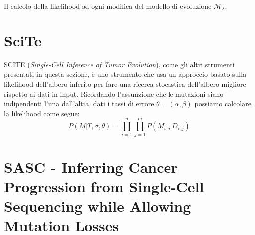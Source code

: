 Il calcolo della likelihood ad ogni modifica del modello di evoluzione $\mathcal{M}_\lambda$. 

\section{SciTe \cite{scite}}
\label{chap:art-scite}
SCITE (\textit{Single-Cell Inference of Tumor Evolution}), come gli altri strumenti presentati in questa sezione, è uno strumento che usa un approccio basato sulla likelihood dell'albero inferito per fare una ricerca stocastica dell'albero migliore rispetto ai dati in input. Ricordando l'assunzione che le mutazioni siano indipendenti l'una dall'altra, dati i tassi di errore $\theta = (\alpha, \beta)$ possiamo calcolare la likelihood come segue:
\begin{equation}
  P(M | T, \sigma, \theta) = \prod_{i = 1}^{n}\prod_{j = 1}^{m} P(M_{i,j} | D_{i,j})
\end{equation}

\section{SASC - Inferring Cancer Progression from Single-Cell Sequencing while Allowing Mutation Losses \cite{SCiccolellaSasc}}
\label{chap:art-sasc}
